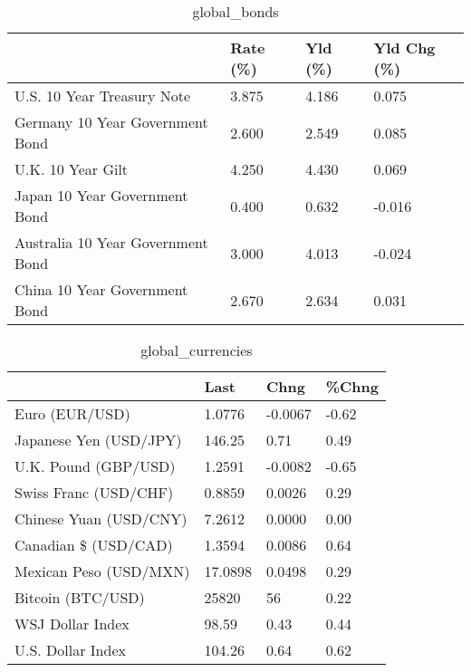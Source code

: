 \documentclass{article}%
\begin{document}
%


\begin{table}[htbp]%
\caption{global\_bonds}%
\centering%
\begin{adjustbox}{width=1\textwidth}%
\begin{tabular}{llll}
\toprule
                                  & Rate (\%) & Yld (\%) & Yld Chg (\%) \\
\midrule
       U.S. 10 Year Treasury Note &    3.875 &   4.186 &       0.075 \\
  Germany 10 Year Government Bond &    2.600 &   2.549 &       0.085 \\
                U.K. 10 Year Gilt &    4.250 &   4.430 &       0.069 \\
    Japan 10 Year Government Bond &    0.400 &   0.632 &      -0.016 \\
Australia 10 Year Government Bond &    3.000 &   4.013 &      -0.024 \\
    China 10 Year Government Bond &    2.670 &   2.634 &       0.031 \\
\bottomrule
\end{tabular}
%
\end{adjustbox}%
\end{table}

%


\begin{table}[htbp]%
\caption{global\_currencies}%
\centering%
\begin{adjustbox}{width=1\textwidth}%
\begin{tabular}{llll}
\toprule
                       &    Last &    Chng & \%Chng \\
\midrule
        Euro (EUR/USD) &  1.0776 & -0.0067 & -0.62 \\
Japanese Yen (USD/JPY) &  146.25 &    0.71 &  0.49 \\
  U.K. Pound (GBP/USD) &  1.2591 & -0.0082 & -0.65 \\
 Swiss Franc (USD/CHF) &  0.8859 &  0.0026 &  0.29 \\
Chinese Yuan (USD/CNY) &  7.2612 &  0.0000 &  0.00 \\
  Canadian \$ (USD/CAD) &  1.3594 &  0.0086 &  0.64 \\
Mexican Peso (USD/MXN) & 17.0898 &  0.0498 &  0.29 \\
     Bitcoin (BTC/USD) &   25820 &      56 &  0.22 \\
      WSJ Dollar Index &   98.59 &    0.43 &  0.44 \\
     U.S. Dollar Index &  104.26 &    0.64 &  0.62 \\
\bottomrule
\end{tabular}
%
\end{adjustbox}%
\end{table}
\end{document}
